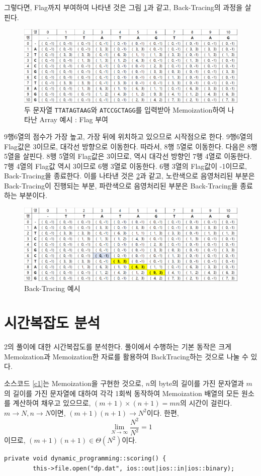 \documentclass[10pt,a4paper]{article}
\begin{document}
\begin{spacing}{1.6}
    그렇다면, Flag까지 부여하여 나타낸 것은 그림 \ref{f2}과 같고, Back-Tracing의 과정을 살핀다. 
    \begin{figure}
    	\centering
    	\includegraphics[width=\linewidth]{Fig2.png}
    	\caption{두 문자열 \texttt{TTATAGTAAG}와 \texttt{ATCCGCTAGG}를 입력받아 Memoization하여 나타난 Array 예시 : Flag 부여}
    	\label{f2}
    \end{figure}
    9행6열의 점수가 가장 높고, 가장 뒤에 위치하고 있으므로 시작점으로 한다. 9행6열의 Flag값은 3이므로, 대각선 방향으로 이동한다. 따라서, 8행 5열로 이동한다. 
    다음은 8행 5열을 살핀다. 8행 5열의 Flag값은 3이므로, 역시 대각선 방향인 7행 4열로 이동한다. 7행 4열의 Flag값 역시 3이므로 6행 3열로 이동한다. 6행 3열의 Flag값이 -1이므로, Back-Tracing을 종료한다. 이를 나타낸 것은 \ref{f3}과 같고, 노란색으로 음영처리된 부분은 Back-Tracing이 진행되는 부분, 파란색으로 음영처리된 부분은 Back-Tracing을 종료하는 부분이다.
    \begin{figure}
    	\centering
    	\includegraphics[width=\linewidth]{Fig3.png}
    	\caption{Back-Tracing 예시}
    	\label{f3}
    \end{figure}
    
\section{시간복잡도 분석}
  2의 풀이에 대한 시간복잡도를 분석한다. 풀이에서 수행하는 기본 동작은 크게 Memoization과 Memoization한 자료를 활용하여 BackTracing하는 것으로 나눌 수 있다. 
  
  소스코드 \ref{c1}는 Memoization을 구현한 것으로, $n$의 byte의 길이를 가진 문자열과 $m$의 길이를 가진 문자열에 대하여 각각 1회씩 동작하여 Memoization 배열의 모든 원소를 계산하여 채우고 있으므로, $(m+1) \times (n+1) = mn$의 시간이 걸린다.  $ m \rightarrow N, n \rightarrow N$이면, $(m+1)(n+1) \rightarrow  N^2$이다. 한편,\[ \lim_{N \rightarrow \infty } \dfrac{N^2}{N^2} = 1\] 이므로, $(m+1)(n+1) \in \Theta(N^2)$이다. 
  \begin{lstlisting}[caption={Memoization의 구현, 26번째 줄부러 36번째 줄까지는 점수를 계산하는 작업이고, 그 이후는 Memoization을 위하여 파일에 점수와 Flag를 쓰는 작업이다.}, label={c1}]
  	 private void dynamic_programming::scoring() {
  		this->file.open("dp.dat", ios::out|ios::in|ios::binary);
  		

\end{lstlisting}
\end{spacing}
\end{document}
